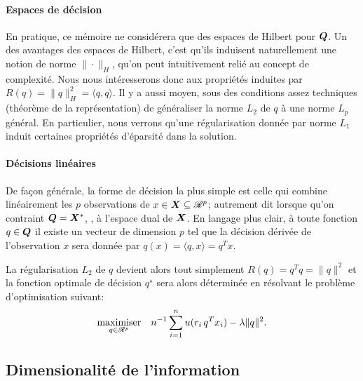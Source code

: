 


\paragraph{Espaces de décision}

En pratique, ce mémoire ne considérera que des espaces de Hilbert pour $\Q$. Un des
avantages des espaces de Hilbert, c'est qu'ils induisent naturellement une notion de norme
$\|\cdot\|_H$, qu'on peut intuitivement relié au concept de complexité. Nous nous
intéresserons donc aux propriétés induites par $R(q) = \|q\|_H^2 = \langle q, q \rangle$. Il y a
aussi moyen, sous des conditions assez techniques (théorème de la représentation) de
généraliser la norme $L_2$ de $q$ à une norme $L_p$ général. En particulier, nous verrons
qu'une régularisation donnée par norme $L_1$ induit certaines propriétés d'éparsité dans
la solution.


\paragraph{Décisions linéaires}

De façon générale, la forme de décision la plus simple est celle qui combine linéairement
les $p$ observations de $x \in \X \subseteq \Re^p$; autrement dit lorsque qu'on contraint
$\Q = \X^*$, \ie, à l'espace dual de $\X$. En langage plus clair, à toute fonction
$q \in \Q$ il existe un vecteur de dimension $p$ tel que la décision dérivée de
l'observation $x$ sera donnée par $q(x) = \langle q, x \rangle = q^Tx$.

La régularisation $L_2$ de $q$ devient alors tout simplement $R(q) = q^Tq = \|q\|^2$ et la
fonction optimale de décision $q^\star$ sera alors déterminée en résolvant le problème
d'optimisation suivant:
\begin{equation}
  \maximizeEquation[q \in \Re^p]{n^{-1}\sumi u(r_i\,q^Tx_i) - \lambda \|q\|^2.}
\end{equation}



\subsection{Dimensionalité de l'information}




